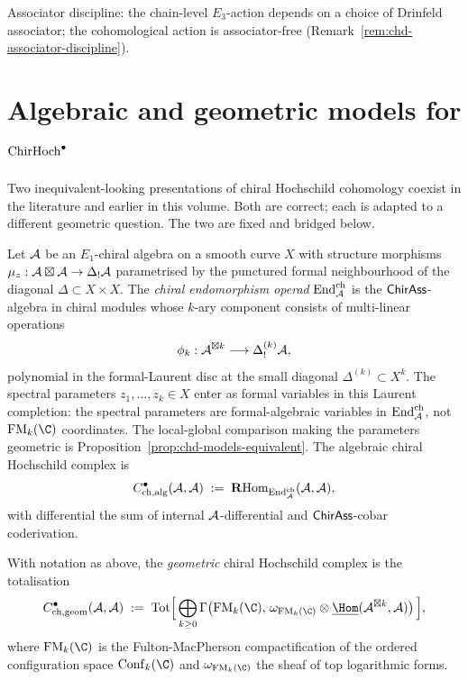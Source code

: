 Associator discipline: the chain-level $E_3$-action depends on a
choice of Drinfeld associator; the cohomological action is
associator-free (Remark~\ref{rem:chd-associator-discipline}).

\section{Algebraic and geometric models for $\mathrm{ChirHoch}^\bullet$}
\label{sec:chd-setup}

Two inequivalent-looking presentations of chiral Hochschild
cohomology coexist in the literature and earlier in this volume.
Both are correct; each is adapted to a different geometric
question. The two are fixed and bridged below.

\begin{definition}%
\label{def:chd-alg}%
%
Let $\mathcal{A}$ be an $E_1$-chiral algebra on a smooth curve $X$ with
structure morphisms $\mu_z : \mathcal{A} \boxtimes \mathcal{A} \to \Delta_! \mathcal{A}$
parametrised by the punctured formal neighbourhood of the diagonal
$\Delta \subset X\times X$. The \emph{chiral endomorphism operad}
$\mathrm{End}^{\mathrm{ch}}_{\mathcal{A}}$ is the $\mathsf{ChirAss}$-algebra in chiral modules
whose $k$-ary component consists of multi-linear operations
\[
\phi_k : \mathcal{A}^{\boxtimes k} \longrightarrow \Delta^{(k)}_! \mathcal{A},
\]
polynomial in the formal-Laurent disc at the small diagonal
$\Delta^{(k)} \subset X^k$. The spectral parameters
$z_1, \ldots, z_k \in X$ enter as formal variables in this
Laurent completion: the spectral parameters are formal-algebraic
variables in $\mathrm{End}^{\mathrm{ch}}_{\mathcal{A}}$, not $\FM_k(\C)$ coordinates.
The local-global comparison making the parameters geometric is
Proposition~\ref{prop:chd-models-equivalent}.
The algebraic chiral Hochschild complex is
\begin{equation}\label{eq:chd-alg-def}
 C^\bullet_{\mathrm{ch,alg}}(\mathcal{A}, \mathcal{A}) \;:=\;
 \mathbf{R}\mathrm{Hom}_{\mathrm{End}^{\mathrm{ch}}_{\mathcal{A}}}(\mathcal{A}, \mathcal{A}),
\end{equation}
with differential the sum of internal $\mathcal{A}$-differential and
$\mathsf{ChirAss}$-cobar coderivation.
\end{definition}

\begin{definition}%
\label{def:chd-geom}%
%
With notation as above, the \emph{geometric} chiral Hochschild complex
is the totalisation
\begin{equation}\label{eq:chd-geom-def}
 C^\bullet_{\mathrm{ch,geom}}(\cA, \cA) \;:=\;
 \operatorname{Tot} \Bigl[\,
 \bigoplus_{k \ge 0}
 \Gamma\bigl(\FM_k(\C),\,
 \omega_{\FM_k(\C)}\otimes
 \underline{\Hom}(\cA^{\boxtimes k}, \cA)\bigr)\,\Bigr],
\end{equation}
where $\FM_k(\C)$ is the Fulton-MacPherson compactification of the
ordered configuration space $\Conf_k(\C)$ and $\omega_{\FM_k(\C)}$ the
sheaf of top logarithmic forms.
\end{definition}

